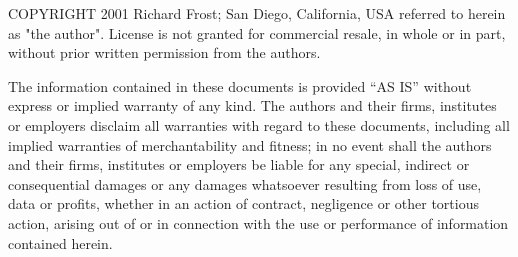 COPYRIGHT 2001 Richard Frost; San Diego,
California, USA referred to herein as "the author".  License is not
granted for commercial resale, in whole or in part, without prior
written permission from the authors.

\vspace{1 em}
The information contained in these documents is
provided ``AS IS'' without express or implied warranty of any kind.
The authors and their firms, institutes or employers disclaim all warranties
with regard to these documents, including all implied warranties of
merchantability and fitness; in no event shall the authors and their firms,
institutes or employers be liable for any special, indirect or consequential
damages or any damages whatsoever resulting from loss of use, data or
profits, whether in an action of contract, negligence or other tortious
action, arising out of or in connection with the use or performance of 
information contained herein.

